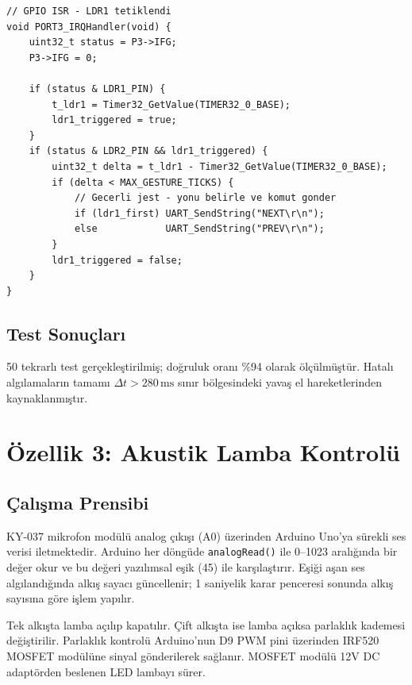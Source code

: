 \documentclass[12pt, a4paper]{article}
\begin{document}
\begin{lstlisting}[style=cstyle, caption={Çift-kapı jest doğrulama mantığı}]
// GPIO ISR - LDR1 tetiklendi
void PORT3_IRQHandler(void) {
    uint32_t status = P3->IFG;
    P3->IFG = 0;

    if (status & LDR1_PIN) {
        t_ldr1 = Timer32_GetValue(TIMER32_0_BASE);
        ldr1_triggered = true;
    }
    if (status & LDR2_PIN && ldr1_triggered) {
        uint32_t delta = t_ldr1 - Timer32_GetValue(TIMER32_0_BASE);
        if (delta < MAX_GESTURE_TICKS) {
            // Gecerli jest - yonu belirle ve komut gonder
            if (ldr1_first) UART_SendString("NEXT\r\n");
            else            UART_SendString("PREV\r\n");
        }
        ldr1_triggered = false;
    }
}
\end{lstlisting}

\subsection{Test Sonuçları}

50 tekrarlı test gerçekleştirilmiş; doğruluk oranı \%94 olarak ölçülmüştür.
Hatalı algılamaların tamamı $\Delta t > 280\,\mathrm{ms}$ sınır bölgesindeki
yavaş el hareketlerinden kaynaklanmıştır.

\section{Özellik 3: Akustik Lamba Kontrolü}

\subsection{Çalışma Prensibi}

KY-037 mikrofon modülü analog çıkışı (A0) üzerinden Arduino Uno'ya sürekli ses verisi iletmektedir. Arduino her döngüde \texttt{analogRead()} ile 0--1023 aralığında bir değer okur ve bu değeri yazılımsal eşik (45) ile karşılaştırır. Eşiği aşan ses algılandığında alkış sayacı güncellenir; 1 saniyelik karar penceresi sonunda alkış sayısına göre işlem yapılır.

Tek alkışta lamba açılıp kapatılır. Çift alkışta ise lamba açıksa parlaklık kademesi değiştirilir. Parlaklık kontrolü Arduino'nun D9 PWM pini üzerinden IRF520 MOSFET modülüne sinyal gönderilerek sağlanır. MOSFET modülü 12V DC adaptörden beslenen LED lambayı sürer.
\end{document}
